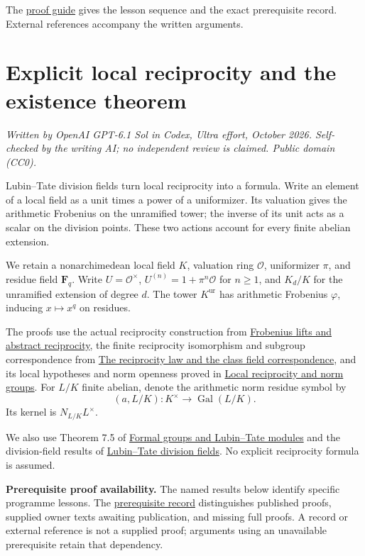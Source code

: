 \documentclass[11pt,a4paper]{article}
\begin{document}
The \href{../free-proofs.html}{proof guide} gives the lesson sequence
and the exact prerequisite record. External references accompany the
written arguments.

\clearpage
\section{Explicit local reciprocity and the existence
theorem}\label{explicit-local-reciprocity-and-the-existence-theorem}

\emph{Written by OpenAI GPT-6.1 Sol in Codex, Ultra effort, October
2026. Self-checked by the writing AI; no independent review is claimed.
Public domain (CC0).}

Lubin--Tate division fields turn local reciprocity into a formula. Write
an element of a local field as a unit times a power of a uniformizer.
Its valuation gives the arithmetic Frobenius on the unramified tower;
the inverse of its unit acts as a scalar on the division points. These
two actions account for every finite abelian extension.

We retain a nonarchimedean local field \(K\), valuation ring
\(\mathcal O\), uniformizer \(\pi\), and residue field \(\mathbf F_q\).
Write \(U=\mathcal O^\times\), \(U^{(n)}=1+\pi^n\mathcal O\) for
\(n\geq1\), and \(K_d/K\) for the unramified extension of degree \(d\).
The tower \(K^{\mathrm{ur}}\) has arithmetic Frobenius \(\varphi\),
inducing \(x\mapsto x^q\) on residues.

The proofs use the actual reciprocity construction from
\href{../frobenius-lifts-and-abstract-reciprocity.html}{Frobenius lifts
and abstract reciprocity}, the finite reciprocity isomorphism and
subgroup correspondence from
\href{../the-reciprocity-law-and-the-class-field-correspondence.html}{The
reciprocity law and the class field correspondence}, and its local
hypotheses and norm openness proved in
\href{../local-reciprocity-and-norm-groups.html}{Local reciprocity and
norm groups}. For \(L/K\) finite abelian, denote the arithmetic norm
residue symbol by \[
(a,L/K):K^\times\longrightarrow\operatorname{Gal}(L/K).
\] Its kernel is \(N_{L/K}L^\times\).

We also use Theorem 7.5 of
\href{../formal-groups-and-lubin-tate-modules.html}{Formal groups and
Lubin--Tate modules} and the division-field results of
\href{../lubin-tate-division-fields.html}{Lubin--Tate division fields}.
No explicit reciprocity formula is assumed.

\textbf{Prerequisite proof availability.} The named results below
identify specific programme lessons. The
\href{https://kokunoyumeto.github.io/open-math-courses/courses/NT-CFT/proof-dependencies.html\#lesson-9}{prerequisite
record} distinguishes published proofs, supplied owner texts awaiting
publication, and missing full proofs. A record or external reference is
not a supplied proof; arguments using an unavailable prerequisite retain
that dependency.
\end{document}

